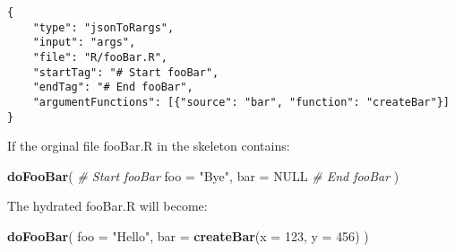 \documentclass[]{article}
\newenvironment{Shaded}{\begin{snugshade}}{\end{snugshade}}
\newcommand{\CommentTok}[1]{\textcolor[rgb]{0.56,0.35,0.01}{\textit{#1}}}
\newcommand{\DataTypeTok}[1]{\textcolor[rgb]{0.13,0.29,0.53}{#1}}
\newcommand{\DecValTok}[1]{\textcolor[rgb]{0.00,0.00,0.81}{#1}}
\newcommand{\KeywordTok}[1]{\textcolor[rgb]{0.13,0.29,0.53}{\textbf{#1}}}
\newcommand{\NormalTok}[1]{#1}
\newcommand{\OtherTok}[1]{\textcolor[rgb]{0.56,0.35,0.01}{#1}}
\newcommand{\StringTok}[1]{\textcolor[rgb]{0.31,0.60,0.02}{#1}}
\begin{document}
\begin{verbatim}
{
    "type": "jsonToRargs",
    "input": "args",
    "file": "R/fooBar.R",
    "startTag": "# Start fooBar",
    "endTag": "# End fooBar",
    "argumentFunctions": [{"source": "bar", "function": "createBar"}]
}
\end{verbatim}

If the orginal file fooBar.R in the skeleton contains:

\begin{Shaded}
\begin{Highlighting}[]
\KeywordTok{doFooBar}\NormalTok{(}
  \CommentTok{# Start fooBar}
  \DataTypeTok{foo =} \StringTok{"Bye"}\NormalTok{,}
  \DataTypeTok{bar =} \OtherTok{NULL}
  \CommentTok{# End fooBar}
\NormalTok{)}
\end{Highlighting}
\end{Shaded}

The hydrated fooBar.R will become:

\begin{Shaded}
\begin{Highlighting}[]
\KeywordTok{doFooBar}\NormalTok{(}
  \DataTypeTok{foo =} \StringTok{"Hello"}\NormalTok{,}
  \DataTypeTok{bar =} \KeywordTok{createBar}\NormalTok{(}\DataTypeTok{x =} \DecValTok{123}\NormalTok{,}
                  \DataTypeTok{y =} \DecValTok{456}\NormalTok{)}
\NormalTok{)}
\end{Highlighting}
\end{Shaded}
\end{document}
